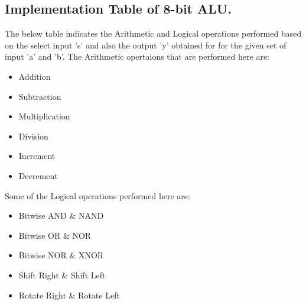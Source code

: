 \documentclass[12pt,singleside,a4paper]{article}
\begin{document}
\subsection{Implementation Table of 8-bit ALU.}
The below table indicates the Arithmetic and Logical operations performed based on the select input 's' and also the output 'y' obtained for for the given set of input 'a' and 'b'.
\vspace{8mm}
The Arithmetic opertaions that are performed here are:
\begin{itemize}
 
    \item Addition
    \item Subtraction
    \item Multiplication
    \item Division
    \item Increment
    \item Decrement
    
\end{itemize}
Some of the Logical operations performed here are:
\begin{itemize}
    \item Bitwise AND \& NAND
    \item Bitwise OR \& NOR
    \item Bitwise NOR \& XNOR
    \item Shift Right \& Shift Left
    \item Rotate Right \& Rotate Left
\end{itemize}
\end{document}
